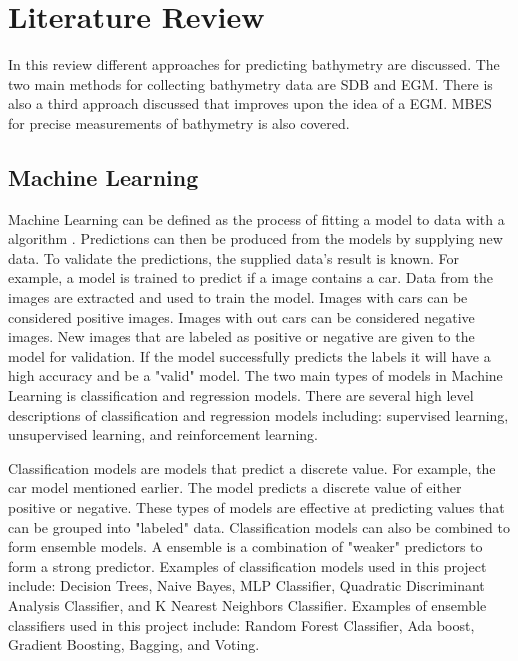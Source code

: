 \section{Literature Review}
\setlength{\parindent}{10ex}
In this review different approaches for predicting bathymetry are discussed.
The two main methods for collecting bathymetry data are \ac{SDB} and \ac{EGM}.
There is also a third approach discussed that improves upon the idea of a \ac{EGM}.
\ac{MBES} for precise measurements of bathymetry \cite{farr1980multibeam} is also covered.

\subsection{Machine Learning}
Machine Learning can be defined as the process of fitting a model to data with a algorithm \cite{bishop2006pattern}.
Predictions can then be produced from the models by supplying new data.
To validate the predictions, the supplied data's result is known.
For example, a model is trained to predict if a image contains a car.
Data from the images are extracted and used to train the model.
Images with cars can be considered positive images.
Images with out cars can be considered negative images.
New images that are labeled as positive or negative are given to the model for validation.
If the model successfully predicts the labels it will have a high accuracy and be a "valid" model.
The two main types of models in Machine Learning is classification and regression models.
There are several high level descriptions of classification and regression models including: supervised learning, unsupervised learning, and reinforcement learning.

\par
Classification models are models that predict a discrete value.
For example, the car model mentioned earlier.
The model predicts a discrete value of either positive or negative.
These types of models are effective at predicting values that can be grouped into "labeled" data.
Classification models can also be combined to form ensemble models.
A ensemble is a combination of "weaker" predictors to form a strong predictor.
Examples of classification models used in this project include: Decision Trees, Naive Bayes, MLP Classifier, Quadratic Discriminant Analysis Classifier, and K Nearest Neighbors Classifier.
Examples of ensemble classifiers used in this project include: Random Forest Classifier, Ada boost, Gradient Boosting, Bagging, and Voting.

